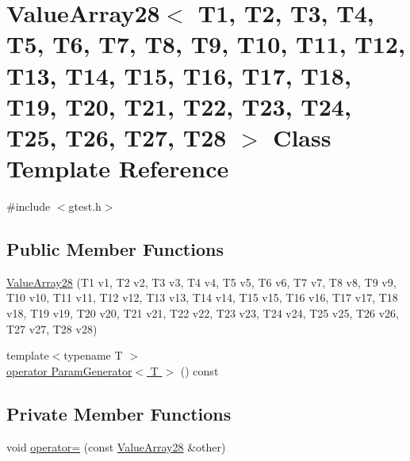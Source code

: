 \hypertarget{classtesting_1_1internal_1_1ValueArray28}{\section{\-Value\-Array28$<$ \-T1, \-T2, \-T3, \-T4, \-T5, \-T6, \-T7, \-T8, \-T9, \-T10, \-T11, \-T12, \-T13, \-T14, \-T15, \-T16, \-T17, \-T18, \-T19, \-T20, \-T21, \-T22, \-T23, \-T24, \-T25, \-T26, \-T27, \-T28 $>$ \-Class \-Template \-Reference}
\label{d5/d8e/classtesting_1_1internal_1_1ValueArray28}
}


{\ttfamily \#include $<$gtest.\-h$>$}

\subsection*{\-Public \-Member \-Functions}
\begin{DoxyCompactItemize}
\item 
\hyperlink{classtesting_1_1internal_1_1ValueArray28_a38b084b2688c2aba0dc6ec0e259b639a}{\-Value\-Array28} (\-T1 v1, \-T2 v2, \-T3 v3, \-T4 v4, \-T5 v5, \-T6 v6, \-T7 v7, \-T8 v8, \-T9 v9, \-T10 v10, \-T11 v11, \-T12 v12, \-T13 v13, \-T14 v14, \-T15 v15, \-T16 v16, \-T17 v17, \-T18 v18, \-T19 v19, \-T20 v20, \-T21 v21, \-T22 v22, \-T23 v23, \-T24 v24, \-T25 v25, \-T26 v26, \-T27 v27, \-T28 v28)
\item 
{\footnotesize template$<$typename T $>$ }\\\hyperlink{classtesting_1_1internal_1_1ValueArray28_a08ef46fa12c9dd8ef6fc630baeea89b7}{operator Param\-Generator$<$ T $>$} () const 
\end{DoxyCompactItemize}
\subsection*{\-Private \-Member \-Functions}
\begin{DoxyCompactItemize}
\item 
void \hyperlink{classtesting_1_1internal_1_1ValueArray28_ad5072453c1a9dbdc2a09ca82284fb0cb}{operator=} (const \hyperlink{classtesting_1_1internal_1_1ValueArray28}{\-Value\-Array28} \&other)
\end{DoxyCompactItemize}
